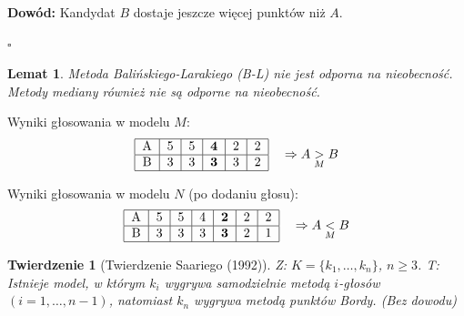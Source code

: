\documentclass[12pt,a4paper]{article}
\theoremstyle{break}
\newtheorem{theorem}{Twierdzenie}[section]
\newtheorem{lemma}{Lemat}[section]
\begin{document}
	\noindent \textbf{Dowód:} Kandydat $B$ dostaje jeszcze więcej punktów niż $A$.  
	\begin{flushright}
		$\square$
	\end{flushright}
	
	\begin{lemma}
		Metoda Balińskiego-Larakiego (B-L) nie jest odporna na nieobecność.  
		Metody mediany również nie są odporne na nieobecność.
	\end{lemma}
	
	\noindent Wyniki głosowania w modelu $M$:
	\[
	\begin{tabular}{|c|c|c|c|c|c|}
		\hline
		A & 5 & 5 & \textbf{4} & 2 & 2 \\ \hline
		B & 3 & 3 & \textbf{3} & 3 & 2 \\ \hline
	\end{tabular}
	\quad \Rightarrow A \underset{M}{>} B
	\]
	
	\noindent Wyniki głosowania w modelu $N$ (po dodaniu głosu):
	\[
	\begin{tabular}{|c|c|c|c|c|c|c|}
		\hline
		A & 5 & 5 & 4 & \textbf{2} & 2 & 2 \\ \hline
		B & 3 & 3 & 3 & \textbf{3} & 2 & 1 \\ \hline
	\end{tabular}
	\quad \Rightarrow A \underset{M}{<} B
	\]
	
	\begin{theorem}[Twierdzenie Saariego (1992)]
		Z: $K = \{k_1, \dots, k_n\}$, $n \geq 3$.  
		T: Istnieje model, w którym $k_i$ wygrywa samodzielnie metodą $i$-głosów $(i = 1, \dots, n-1)$, natomiast $k_n$ wygrywa metodą punktów Bordy. (Bez dowodu)
	\end{theorem}
\end{document}
